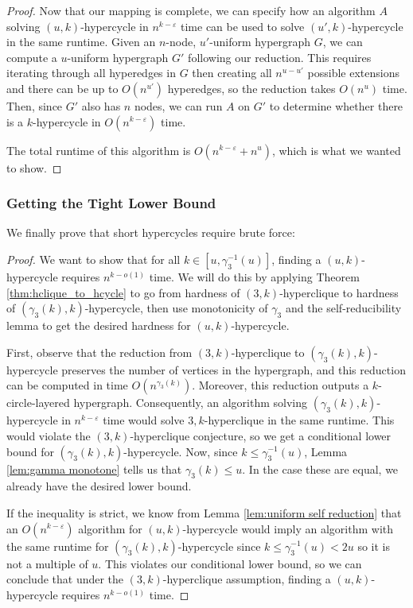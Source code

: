 \documentclass[11pt,letterpaper,pdftex]{article}
\begin{document}
\begin{proof}
    Now that our mapping is complete, we can specify how an algorithm $A$ solving $(u,k)$-hypercycle in $n^{k-\varepsilon}$ time can be used to solve $(u',k)$-hypercycle in the same runtime.
    Given an $n$-node, $u'$-uniform hypergraph $G$, we can compute a $u$-uniform hypergraph $G'$ following our reduction.
    This requires iterating through all hyperedges in $G$ then creating all $n^{u-u'}$ possible extensions and there can be up to $O(n^{u'})$ hyperedges, so the reduction takes $O(n^u)$ time.
    Then, since $G'$ also has $n$ nodes, we can run $A$ on $G'$ to determine whether there is a $k$-hypercycle in $O(n^{k-\varepsilon})$ time.

    The total runtime of this algorithm is $O(n^{k-\varepsilon}+n^u)$, which is what we wanted to show.
\end{proof}

\subsubsection{Getting the Tight Lower Bound}

We finally prove that short hypercycles require brute force:

\tightShortHypercycle*
\begin{proof}We want to show that for all $k \in [u, \gamma_3^{-1}(u)]$, finding a $(u,k)$-hypercycle requires $n^{k-o(1)}$ time.
    We will do this by applying Theorem \ref{thm:hclique_to_hcycle} to go from hardness of $(3,k)$-hyperclique to hardness of $(\gamma_3(k),k)$-hypercycle, then use monotonicity of $\gamma_3$ and the self-reducibility lemma to get the desired hardness for $(u,k)$-hypercycle.

    First, observe that the reduction from $(3,k)$-hyperclique to $(\gamma_3(k),k)$-hypercycle preserves the number of vertices in the hypergraph, and this reduction can be computed in time $O(n^{\gamma_3(k)})$.
    Moreover, this reduction outputs a $k$-circle-layered hypergraph.
    Consequently, an algorithm solving $(\gamma_3(k),k)$-hypercycle in $n^{k-\varepsilon}$ time would solve $3,k$-hyperclique in the same runtime.
    This would violate the $(3,k)$-hyperclique conjecture, so we get a conditional lower bound for $(\gamma_3(k),k)$-hypercycle.
    Now, since $k \leq \gamma_3^{-1}(u)$, Lemma \ref{lem:gamma monotone} tells us that $\gamma_3(k) \leq u$.
    In the case these are equal, we already have the desired lower bound.
    
    If the inequality is strict, we know from Lemma \ref{lem:uniform self reduction} that an $O(n^{k-\varepsilon})$ algorithm for $(u,k)$-hypercycle would imply an algorithm with the same runtime for $(\gamma_3(k),k)$-hypercycle since $k\leq \gamma_3^{-1}(u)<2u$ so it is not a multiple of $u$.
    This violates our conditional lower bound, so we can conclude that under the $(3,k)$-hyperclique assumption, finding a $(u,k)$-hypercycle requires $n^{k-o(1)}$ time.
\end{proof}
\end{document}
